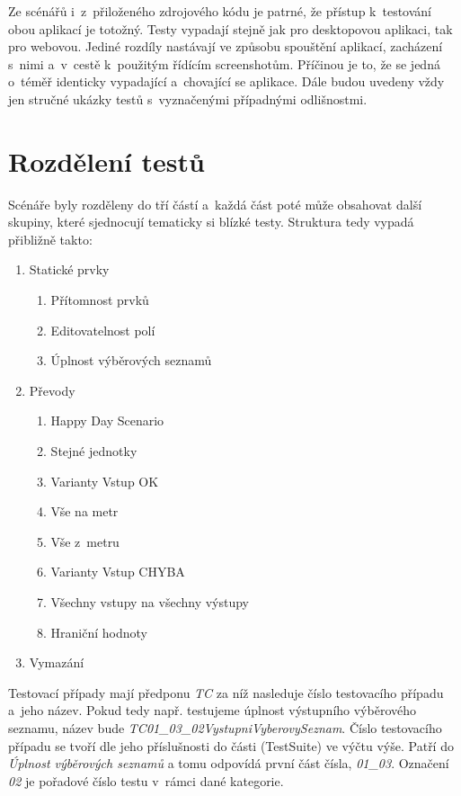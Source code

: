 Ze scénářů i~z~přiloženého zdrojového kódu je patrné, že přístup k~testování obou aplikací je totožný. Testy vypadají stejně jak pro desktopovou aplikaci, tak pro webovou. Jediné rozdíly nastávají ve způsobu spouštění aplikací, zacházení s~nimi a~v~cestě k~použitým řídícím screenshotům. Příčinou je to, že se jedná o~téměř identicky vypadající a~chovající se aplikace. Dále budou uvedeny vždy jen stručné ukázky testů s~vyznačenými případnými odlišnostmi.

	\section{Rozdělení testů}
	Scénáře byly rozděleny do tří částí a~každá část poté může obsahovat další skupiny, které sjednocují tematicky si blízké testy. Struktura tedy vypadá přibližně takto:
		{\renewcommand{\labelenumii}{\theenumii}
		\renewcommand{\theenumii}{\theenumi.\arabic{enumii}.}
		\begin{enumerate}
		\item Statické prvky
			\begin{enumerate}
			\item Přítomnost prvků
			\item Editovatelnost polí
			\item Úplnost výběrových seznamů
			\end{enumerate}
		\item Převody
			\begin{enumerate}
			\item Happy Day Scenario
			\item Stejné jednotky
			\item Varianty Vstup OK
			\item Vše na metr
			\item Vše z~metru
			\item Varianty Vstup CHYBA
			\item Všechny vstupy na všechny výstupy
			\item Hraniční hodnoty
			\end{enumerate}
		\item Vymazání
		\end{enumerate}}
		
	Testovací případy mají předponu \emph{TC} za níž nasleduje číslo testovacího případu a~jeho název. Pokud tedy např. testujeme úplnost výstupního výběrového seznamu, název bude \emph{TC01\_03\_02VystupniVyberovySeznam}. Číslo testovacího případu se tvoří dle jeho příslušnosti do části (TestSuite) ve výčtu výše. Patří do \emph{Úplnost výběrových seznamů} a tomu odpovídá první část čísla, \emph{01\_03}. Označení \emph{02} je pořadové číslo testu v~rámci dané kategorie.
		
